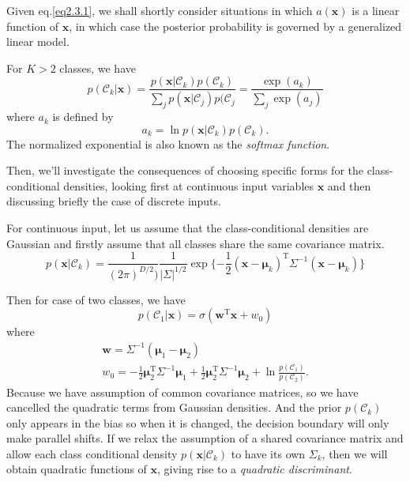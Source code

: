 \documentclass[a4paper]{book}
\newcommand{\mrm}{\mathrm}
\newcommand{\mbf}{\mathbf}
\newcommand{\mcal}{\mathcal}
\newcommand{\ww}{\mbf w}
\newcommand{\xx}{\mbf x}
\newcommand{\bmu}{\bm{\mu}}
\newcommand{\rev}{^{-1}}
\newcommand{\cat}{\mcal C}
\newcommand{\trans}{^{\mrm T}}
\begin{document}
Given eq.\ref{eq2.3.1}, we shall shortly consider situations in which $a(\xx)$ is a linear function of $\xx$, in which case the posterior probability is governed by a generalized linear model.

For $K>2$ classes, we have
\begin{equation}\label{}
  p(\mcal C_k|\xx)=\frac{p(\xx|\mcal C_k)p(\mcal C_k)}{\sum_jp(\xx|\mcal C_j)p(\mcal C_j}=\frac{\exp(a_k)}{\sum_j\exp(a_j)}
\end{equation}
where $a_k$ is defined by
\begin{equation}\label{eq2.3.2}
  a_k = \ln p(\xx|\mcal C_k)p(\mcal C_k).
\end{equation}
The normalized exponential is also known as the \textit{softmax function}.

Then, we'll investigate the consequences of choosing specific forms for the class-conditional densities, looking first at continuous input variables $\xx$ and then discussing briefly the case of discrete inputs.

For continuous input, let us assume that the class-conditional densities are Gaussian and firstly assume that all classes share the same covariance matrix.
\begin{equation}\label{}
  p(\xx|\cat_k)=\frac{1}{(2\pi)^{D/2})}\frac1{|\Sigma|^{1/2}}\exp\{-\frac12(\xx-\bmu_k)\trans\Sigma\rev(\xx-\bmu_k)\}
\end{equation}

Then for case of two classes, we have
\begin{equation}\label{}
  p(\mcal C_1|\xx)= \sigma(\ww\trans\xx+w_0)
\end{equation}
where
\begin{gather}\label{}
  \ww = \Sigma\rev(\bmu_1-\bmu_2) \\
  w_0 = -\frac12\bmu_2\trans\Sigma\rev\bmu_1+\frac{1}{2}\bmu_2\trans\Sigma\rev\bmu_2+\ln\frac{p(\mcal C_1)}{p(\mcal C_2)}.
\end{gather}
Because we have assumption of common covariance matrices, so we have cancelled the quadratic terms from Gaussian densities. And the prior $p(\mcal C_k)$ only appears in the bias so when it is changed, the decision boundary will only make parallel shifts. If we relax the assumption of a shared covariance matrix and allow each class conditional density $p(\xx|\mcal C_k)$ to have its own $\Sigma_k$, then we will obtain quadratic functions of $\xx$, giving rise to a \textit{quadratic discriminant}.
\end{document}
